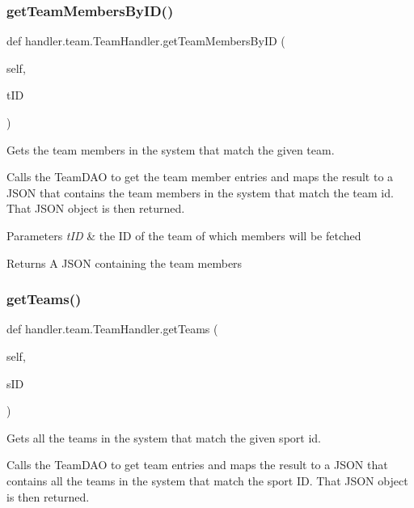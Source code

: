 \subsubsection{\texorpdfstring{get\+Team\+Members\+By\+I\+D()}{getTeamMembersByID()}}
{\footnotesize\ttfamily def handler.\+team.\+Team\+Handler.\+get\+Team\+Members\+By\+ID (\begin{DoxyParamCaption}\item[{}]{self,  }\item[{}]{t\+ID }\end{DoxyParamCaption})}



Gets the team members in the system that match the given team. 

Calls the Team\+D\+AO to get the team member entries and maps the result to a J\+S\+ON that contains the team members in the system that match the team id. That J\+S\+ON object is then returned.


\begin{DoxyParams}{Parameters}
{\em t\+ID} & the ID of the team of which members will be fetched\\
\hline
\end{DoxyParams}
\begin{DoxyReturn}{Returns}
A J\+S\+ON containing the team members 
\end{DoxyReturn}
\mbox{\label{classhandler_1_1team_1_1_team_handler_aeb227f1fec1cfad96ce56cf7de054552}} 
\subsubsection{\texorpdfstring{get\+Teams()}{getTeams()}}
{\footnotesize\ttfamily def handler.\+team.\+Team\+Handler.\+get\+Teams (\begin{DoxyParamCaption}\item[{}]{self,  }\item[{}]{s\+ID }\end{DoxyParamCaption})}



Gets all the teams in the system that match the given sport id. 

Calls the Team\+D\+AO to get team entries and maps the result to a J\+S\+ON that contains all the teams in the system that match the sport ID. That J\+S\+ON object is then returned.


